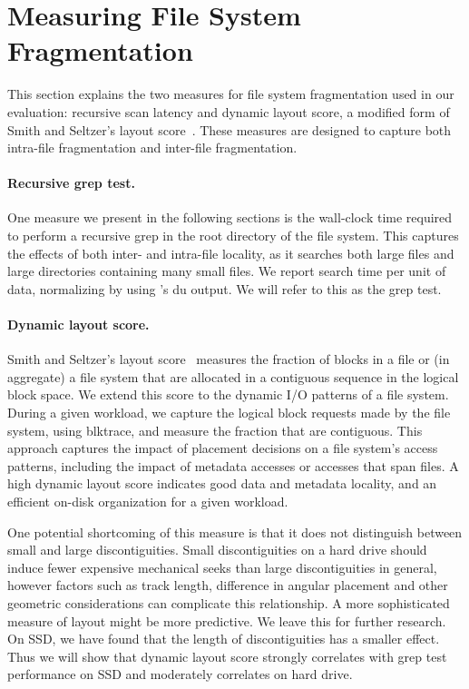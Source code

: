 \section{Measuring File System Fragmentation}\label{sec:fsa-metrics}

This section explains the two measures for file system fragmentation used in
our evaluation: recursive scan latency and dynamic layout score, a modified
form of Smith and Seltzer's layout score~\cite{DBLP:conf/sigmetrics/SmithS97}.
These measures are designed to capture both intra-file fragmentation and
inter-file fragmentation. 

\paragraph{Recursive grep test.} One measure we present in the following
sections is the wall-clock time required to perform a recursive grep in the
root directory of the file system.  This captures the effects of both inter-
and intra-file locality, as it searches both large files and large directories
containing many small files.  We report search time per unit of data,
normalizing by using \ext's du output.  We will refer to this as the grep test. 

\paragraph{Dynamic layout score.}  Smith and Seltzer's layout
score~\cite{DBLP:conf/sigmetrics/SmithS97} measures the fraction of blocks in a
file or (in aggregate) a file system that are allocated in a contiguous
sequence in the logical block space.  We extend this score to the dynamic I/O
patterns of a file system.  During a given workload, we capture the logical
block requests made by the file system, using blktrace, and measure the
fraction that are contiguous.  This approach captures the impact of placement
decisions on a file system's access patterns, including the impact of metadata
accesses or accesses that span files.  A high dynamic layout score indicates
good data and metadata locality, and an efficient on-disk organization for a
given workload.

One potential shortcoming of this measure is that it does not distinguish
between small and large discontiguities. Small discontiguities on a hard drive
should induce fewer expensive mechanical seeks than large discontiguities in
general, however factors such as track length, difference in angular placement
and other geometric considerations can complicate this relationship. A more
sophisticated measure of layout might be more predictive.  We leave this for
further research. On SSD, we have found that the length of discontiguities has
a smaller effect.  Thus we will show that dynamic layout score strongly
correlates with grep test performance on SSD and moderately correlates on hard
drive.
